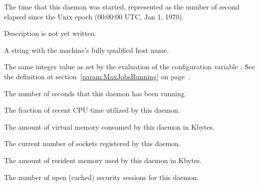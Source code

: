 \begin{description}

\item[\AdAttr{DaemonStartTime}:] The time that this daemon was
  started, represented as the number of second elapsed since
    the Unix epoch (00:00:00 UTC, Jan 1, 1970).

\item[\AdAttr{JobQueueBirthdate}:] Description is not yet written.

\item[\AdAttr{Machine}:] A string with the machine's fully qualified 
  host name.

\item[\AdAttr{MaxJobsRunning}:] The same integer value as set by the
  evaluation of the configuration variable .
  See the definition at section~\ref{param:MaxJobsRunning} on
  page~\pageref{param:MaxJobsRunning}.

\item[\AdAttr{MonitorSelfAge}:] The number of seconds that this daemon
  has been running.

\item[\AdAttr{MonitorSelfCPUUsage}:] The fraction of recent CPU time utilized
  by this daemon. 

\item[\AdAttr{MonitorSelfImageSize}:] The amount of virtual memory consumed by
  this daemon in Kbytes.

\item[\AdAttr{MonitorSelfRegisteredSocketCount}:] The current number of sockets
  registered by this daemon.

\item[\AdAttr{MonitorSelfResidentSetSize}:] The amount of resident memory
  used by this daemon in Kbytes.

\item[\AdAttr{MonitorSelfSecuritySessions}:] The number of open (cached)
  security sessions for this daemon.


\end{description}
